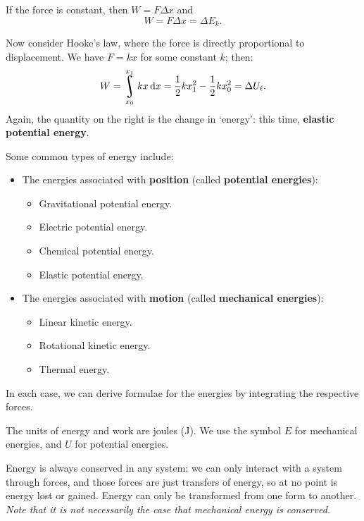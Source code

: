 \documentclass[a4paper]{amsbook}
\theoremstyle{definition}
\numberwithin{exercise}{chapter}
\numberwithin{exercise}{chapter}
\DeclareMathOperator*{\rint}{\scalerel*{\rotatebox{17}{$\!\int\!$}}{\int}}
\begin{document}
If the force is constant, then $ W = F\Delta x $ and
\begin{equation}
  W = F \Delta x = \Delta E_k.
\end{equation}

Now consider Hooke's law, where the force is directly proportional to displacement. We have $ F = kx $ for some constant $ k $; then:
\begin{equation}
  W = \rint_{x_0}^{x_1} kx \dif{x} = \frac{1}{2}kx_1^2 - \frac{1}{2}kx_0^2 = \Delta U_\ell.
\end{equation}
Again, the quantity on the right is the change in `energy': this time, \textbf{elastic potential energy}.

Some common types of energy include:
\begin{itemize}
  \item The energies associated with \textbf{position} (called \textbf{potential energies}):
    \begin{itemize}
      \item Gravitational potential energy.
      \item Electric potential energy.
      \item Chemical potential energy.
      \item Elastic potential energy.
    \end{itemize}
  \item The energies associated with \textbf{motion} (called \textbf{mechanical energies}):
    \begin{itemize}
      \item Linear kinetic energy.
      \item Rotational kinetic energy.
      \item Thermal energy.
    \end{itemize}
\end{itemize}
In each case, we can derive formulae for the energies by integrating the respective forces.

The units of energy and work are joules (J). We use the symbol $ E $ for mechanical energies, and $ U $ for potential energies.

Energy is always conserved in any system: we can only interact with a system through forces, and those forces are just transfers of
energy, so at no point is energy lost or gained. Energy can only be transformed from one form to another. \emph{Note that it is
not necessarily the case that \emph{mechanical} energy is conserved.}
\end{document}
